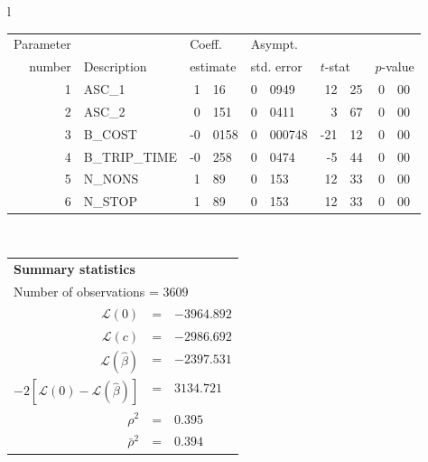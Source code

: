   \begin{tabular}{l}
\begin{tabular}{rlr@{.}lr@{.}lr@{.}lr@{.}l}
Parameter &                       &   \multicolumn{2}{l}{Coeff.}      & \multicolumn{2}{l}{Asympt.}  &     \multicolumn{4}{l}{}   \\
number &  Description                     &   \multicolumn{2}{l}{estimate}      & \multicolumn{2}{l}{std. error}  &   \multicolumn{2}{l}{$t$-stat}  &   \multicolumn{2}{l}{$p$-value}   \\

\hline

1 & ASC\_1 & 1&16 & 0&0949 & 12&25 & 0&00 \\
2 & ASC\_2 & 0&151 & 0&0411 & 3&67 & 0&00 \\
3 & B\_COST & -0&0158 & 0&000748 & -21&12 & 0&00 \\
4 & B\_TRIP\_TIME & -0&258 & 0&0474 & -5&44 & 0&00 \\
\hline
5 & N\_NONS & 1&89 & 0&153 & 12&33\footnotemark[1] & 0&00 \\
6 & N\_STOP & 1&89 & 0&153 & 12&33\footnotemark[1] & 0&00 \\
\hline

\end{tabular}
\\
\begin{tabular}{rcl}
\multicolumn{3}{l}{\bf Summary statistics}\\
\multicolumn{3}{l}{ Number of observations = $3609$} \\
 $\mathcal{L}(0)$ &=&  $-3964.892$ \\
 $\mathcal{L}(c)$ &=& $-2986.692$\\
 $\mathcal{L}(\hat{\beta})$ &=& $-2397.531 $  \\
 $-2[\mathcal{L}(0) -\mathcal{L}(\hat{\beta})]$ &=& $3134.721$ \\
    $\rho^2$ &=&   $0.395$ \\
    $\bar{\rho}^2$ &=&    $0.394$ \\
\end{tabular}
\end{tabular}

